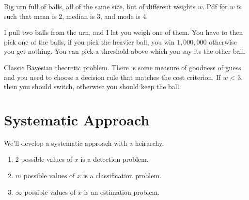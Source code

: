 \documentclass[psamsfonts]{amsart}
\begin{document}
Big urn full of balls, all of the same size, but of different weights $w$. Pdf for $w$ is such that mean is 2, median is 3, and mode is 4. 

I pull two balls from the urn, and I let you weigh one of them. You have to then pick one of the balls, if you pick the heavier ball, you win $1,000,000$ otherwise you get nothing. You can pick a threshold above which you say its the other ball. 

Classic Bayesian theoretic problem. There is some measure of goodness of guess and you need to choose a decision rule that matches the cost criterion. If $w$ < 3, then you should switch, otherwise you should keep the ball. 

\section{Systematic Approach}

We'll develop a systematic approach with a heirarchy.

\begin{enumerate}
\item 2 possible values of $x$ is a detection problem.
\item $m$ possible values of $x$ is a classification problem.
\item $\infty$ possible values of $x$ is an estimation problem.
\end{enumerate}
\end{document}
